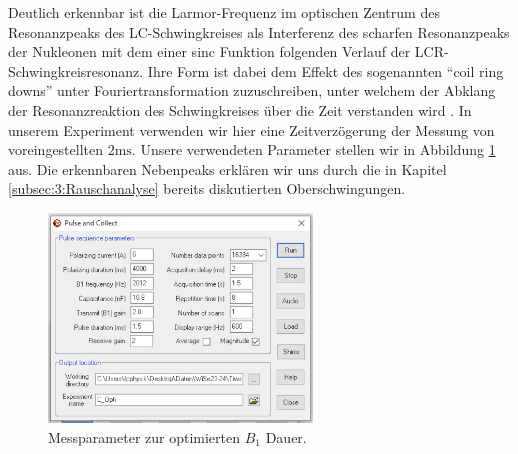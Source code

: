 \documentclass{article}
\begin{document}
            Deutlich erkennbar ist die Larmor-Frequenz im optischen Zentrum des Resonanzpeaks des LC-Schwingkreises als Interferenz des scharfen Resonanzpeaks der Nukleonen mit dem einer sinc Funktion folgenden Verlauf der LCR-Schwingkreisresonanz. Ihre Form ist dabei dem Effekt des sogenannten \enquote{coil ring downs} unter Fouriertransformation zuzuschreiben, unter welchem der Abklang der Resonanzreaktion des Schwingkreises über die Zeit verstanden wird \cite[ch 1.4.5]{doc:EFNMRStudentManual}. In unserem Experiment verwenden wir hier eine Zeitverzögerung der Messung von voreingestellten $2\si{\ms}$. Unsere verwendeten Parameter stellen wir in Abbildung \ref{fig:5.1:B1OptiParameter} aus. Die erkennbaren Nebenpeaks erklären wir uns durch die in Kapitel \ref{subsec:3:Rauschanalyse} bereits diskutierten Oberschwingungen. 
            \begin{figure}[H]
                \centering
                \includegraphics[width=7cm]{../Bilddateien/C_Abtastparameter.png}
                \caption{Messparameter zur optimierten $B_1$ Dauer.}
                \label{fig:5.1:B1OptiParameter}
            \end{figure}
\end{document}
